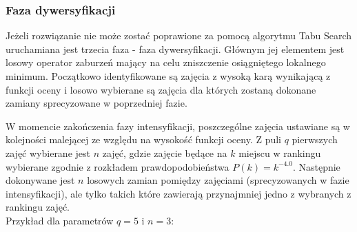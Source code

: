 \subsubsection{Faza dywersyfikacji}
\par Jeżeli rozwiązanie nie może zostać poprawione za pomocą algorytmu Tabu Search uruchamiana jest trzecia faza - faza dywersyfikacji. Głównym jej elementem jest losowy operator zaburzeń mający na celu zniszczenie osiągniętego lokalnego minimum. Początkowo identyfikowane są zajęcia z wysoką karą wynikającą z funkcji oceny  i losowo wybierane są zajęcia dla których zostaną dokonane zamiany sprecyzowane w poprzedniej fazie.
\par W momencie zakończenia fazy intensyfikacji, poszczególne zajęcia ustawiane są w kolejności malejącej ze względu na wysokość funkcji oceny. Z puli $q$ pierwszych zajęć wybierane jest $n$ zajęć, gdzie zajęcie będące na $k$ miejscu w rankingu wybierane zgodnie z rozkładem prawdopodobieństwa $P(k) = k^{-4.0}$. Następnie dokonywane jest $n$ losowych zamian pomiędzy zajęciami (sprecyzowanych w fazie intensyfikacji), ale tylko takich które zawierają przynajmniej jedno z wybranych z rankingu zajęć. \\
Przykład dla parametrów $q = 5$ i $n = 3$:
